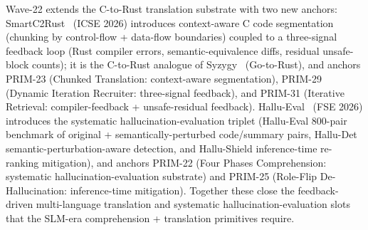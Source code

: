 Wave-22 extends the C-to-Rust translation substrate with two new anchors: SmartC2Rust~\cite{p151_shiraishi_smartc2rust_2026} (ICSE 2026) introduces context-aware C code segmentation (chunking by control-flow + data-flow boundaries) coupled to a three-signal feedback loop (Rust compiler errors, semantic-equivalence diffs, residual unsafe-block counts); it is the C-to-Rust analogue of Syzygy~\cite{p124_shetty_syzygy_2025} (Go-to-Rust), and anchors PRIM-23 (Chunked Translation: context-aware segmentation), PRIM-29 (Dynamic Iteration Recruiter: three-signal feedback), and PRIM-31 (Iterative Retrieval: compiler-feedback + unsafe-residual feedback). Hallu-Eval~\cite{p152_liu_hallueval_2026} (FSE 2026) introduces the systematic hallucination-evaluation triplet (Hallu-Eval 800-pair benchmark of original + semantically-perturbed code/summary pairs, Hallu-Det semantic-perturbation-aware detection, and Hallu-Shield inference-time re-ranking mitigation), and anchors PRIM-22 (Four Phases Comprehension: systematic hallucination-evaluation substrate) and PRIM-25 (Role-Flip De-Hallucination: inference-time mitigation). Together these close the feedback-driven multi-language translation and systematic hallucination-evaluation slots that the SLM-era comprehension + translation primitives require.

